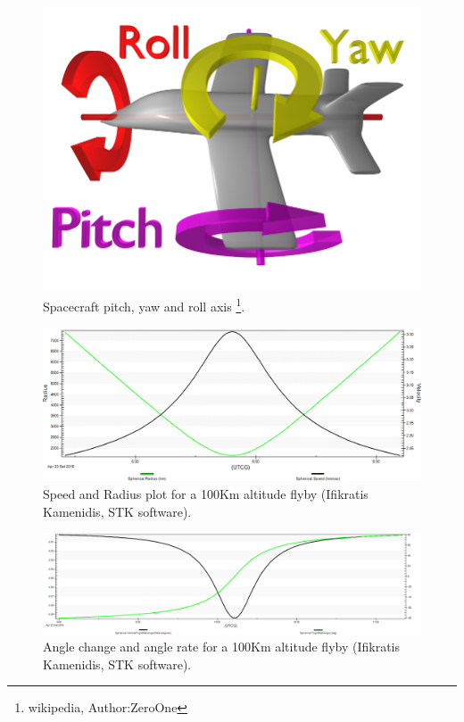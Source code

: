 \begin{figure}[htb!]
\centering
\includegraphics[scale=0.5]{figures/Orbiter/axis_o.png}
\caption[Spacecraft pitch, yaw and roll axis]{Spacecraft pitch, yaw and roll axis \footnote{wikipedia, Author:ZeroOne}.}
\label{axis_o}
\end{figure}

\begin{figure}[htb!]
\centering
\includegraphics[width=\textwidth]{figures/Orbiter/flybyspeed.png}
\caption{Speed and Radius plot for a 100Km altitude flyby (Ifikratis Kamenidis, STK software).}
\label{flybyspeed}
\end{figure}

\begin{figure}[htb!]
\centering
\includegraphics[width=\textwidth]{figures/Orbiter/anglerate2.png}
\caption{Angle change and angle rate for a 100Km altitude flyby (Ifikratis Kamenidis, STK software).}
\label{flybyangle}
\end{figure}